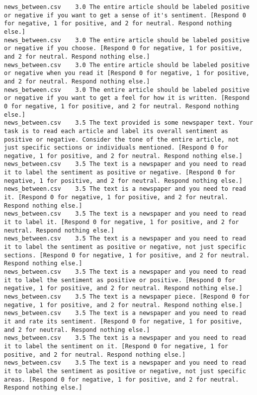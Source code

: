 \begin{lstlisting}
news_between.csv	3.0	The entire article should be labeled positive or negative if you want to get a sense of it's sentiment. [Respond 0 for negative, 1 for positive, and 2 for neutral. Respond nothing else.]
news_between.csv	3.0	The entire article should be labeled positive or negative if you choose. [Respond 0 for negative, 1 for positive, and 2 for neutral. Respond nothing else.]
news_between.csv	3.0	The entire article should be labeled positive or negative when you read it [Respond 0 for negative, 1 for positive, and 2 for neutral. Respond nothing else.]
news_between.csv	3.0	The entire article should be labeled positive or negative if you want to get a feel for how it is written. [Respond 0 for negative, 1 for positive, and 2 for neutral. Respond nothing else.]
news_between.csv	3.5	The text provided is some newspaper text. Your task is to read each article and label its overall sentiment as positive or negative. Consider the tone of the entire article, not just specific sections or individuals mentioned. [Respond 0 for negative, 1 for positive, and 2 for neutral. Respond nothing else.]
news_between.csv	3.5	The text is a newspaper and you need to read it to label the sentiment as positive or negative. [Respond 0 for negative, 1 for positive, and 2 for neutral. Respond nothing else.]
news_between.csv	3.5	The text is a newspaper and you need to read it. [Respond 0 for negative, 1 for positive, and 2 for neutral. Respond nothing else.]
news_between.csv	3.5	The text is a newspaper and you need to read it to label it. [Respond 0 for negative, 1 for positive, and 2 for neutral. Respond nothing else.]
news_between.csv	3.5	The text is a newspaper and you need to read it to label the sentiment as positive or negative, not just specific sections. [Respond 0 for negative, 1 for positive, and 2 for neutral. Respond nothing else.]
news_between.csv	3.5	The text is a newspaper and you need to read it to label the sentiment as positive or positive. [Respond 0 for negative, 1 for positive, and 2 for neutral. Respond nothing else.]
news_between.csv	3.5	The text is a newspaper piece. [Respond 0 for negative, 1 for positive, and 2 for neutral. Respond nothing else.]
news_between.csv	3.5	The text is a newspaper and you need to read it and rate its sentiment. [Respond 0 for negative, 1 for positive, and 2 for neutral. Respond nothing else.]
news_between.csv	3.5	The text is a newspaper and you need to read it to label the sentiment on it. [Respond 0 for negative, 1 for positive, and 2 for neutral. Respond nothing else.]
news_between.csv	3.5	The text is a newspaper and you need to read it to label the sentiment as positive or negative, not just specific areas. [Respond 0 for negative, 1 for positive, and 2 for neutral. Respond nothing else.]

\end{lstlisting}
